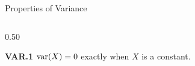 \documentclass[9pt,english,aspectratio=169]{beamer}
\begin{document}
\begin{frame}{Properties of Variance}

  \begin{columns}[T]
    \begin{column}{0.50\textwidth}
      \begin{methodbox}
        \textbf{VAR.1} \quad $\operatorname{var}(X) = 0$ exactly when $X$ is a constant.
      \end{methodbox}

      \vspace{0.4em}

      \vspace{0.4em}


\end{column}
\end{columns}
\end{frame}
\end{document}
